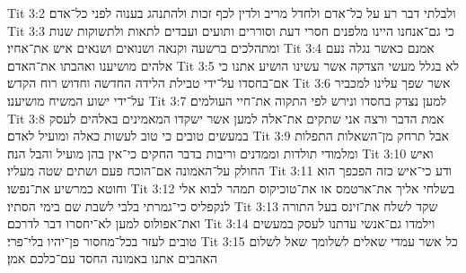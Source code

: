 Tit 3:2  ולבלתי דבר רע על כל־אדם ולחדל מריב ולדין לכף זכות ולהתנהג בענוה לפני כל־אדם׃
Tit 3:3  כי גם־אנחנו היינו מלפנים חסרי דעת וסוררים ותועים ועבדים לתאות ולתשוקות שנות ומתהלכים ברשעה וקנאה ושנואים ושנאים איש את־אחיו׃
Tit 3:4  אמנם כאשר נגלה נעם אלהים מושיענו ואהבתו את־האדם׃
Tit 3:5  לא בגלל מעשי הצדקה אשר עשינו הושיע אתנו כי אם־בחסדו על־ידי טבילת הלידה החדשה וחדוש רוח הקדש׃
Tit 3:6  אשר שפך עלינו למכביר על־ידי ישוע המשיח מושיענו׃
Tit 3:7  למען נצדק בחסדו ונירש לפי התקוה את־חיי העולמים׃
Tit 3:8  אמת הדבר ורצה אני שתקים את־אלה למען אשר ישקדו המאמינים באלהים לעסק במעשים טובים כי טוב לעשות כאלה ומועיל לאדם׃
Tit 3:9  אבל תרחק מן־השאלות התפלות ומלמודי תולדות וממדנים וריבות בדבר החקים כי־אין בהן מועיל והבל הנה׃
Tit 3:10  ואיש החולק על־האמונה אם־הוכח פעם ושתים שטה מעליו׃
Tit 3:11  ודע כי־איש כזה הפכפך הוא וחוטא כמרשיע את־נפשו׃
Tit 3:12  בשלחי אליך את־ארטמס או את־טוכיקוס תמהר לבוא אלי לנקפליס כי־גמרתי בלבי לשבת שם בימי הסתיו׃
Tit 3:13  שקד לשלח את־זינס בעל התורה ואת־אפולוס למען לא־יחסרו דבר לדרכם׃
Tit 3:14  וילמדו גם־אנשי עדתנו לעסק במעשים טובים לעזר בכל־מחסור פן־יהיו בלי־פרי׃
Tit 3:15  כל אשר עמדי שאלים לשלומך שאל לשלום האהבים אתנו באמונה החסד עם־כלכם אמן׃


